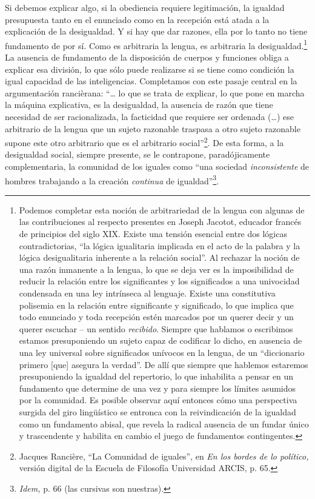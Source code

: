 Si debemos explicar algo, si la obediencia requiere legitimación, la igualdad presupuesta tanto en el enunciado como en la recepción está atada a la explicación de la desigualdad. Y si hay que dar razones, ella por lo tanto no tiene fundamento de por sí. Como es arbitraria la lengua, es arbitraria la desigualdad.\footnote{Podemos completar esta noción de arbitrariedad de la lengua con algunas de las contribuciones al respecto presentes en Joseph Jacotot, educador francés de principios del siglo XIX. Existe una tensión esencial entre dos lógicas contradictorias, \enquote{la lógica igualitaria implicada en el acto de la palabra y la lógica desigualitaria inherente a la relación social}. Al rechazar la noción de una razón inmanente a la lengua, lo que se deja ver es la imposibilidad de reducir la relación entre los significantes y los significados a una univocidad condensada en una ley intrínseca al lenguaje. Existe una constitutiva polisemia en la relación entre significante y significado, lo que implica que todo enunciado y toda recepción estén marcados por un querer decir  y un querer escuchar -- un sentido \emph{recibido}. Siempre que hablamos o escribimos estamos presuponiendo un sujeto capaz de codificar lo dicho, en ausencia de una ley universal sobre significados unívocos en la lengua, de un \enquote{diccionario primero {[}que{]} asegura la verdad}. De allí que siempre que hablemos estaremos presuponiendo la igualdad del repertorio, lo que inhabilita a pensar en un fundamento que determine de una vez y para siempre los límites asumidos por la comunidad. Es posible observar aquí entonces cómo una perspectiva surgida del giro lingüístico se entronca con la reivindicación de la igualdad como un fundamento abisal, que revela la radical ausencia de un fundar único y trascendente y habilita en cambio el juego de fundamentos contingentes.} La ausencia de fundamento de la disposición de cuerpos y funciones obliga a explicar esa división, lo que sólo puede realizarse si se tiene como condición la igual capacidad de las inteligencias. Completamos con este pasaje central en la argumentación rancièrana: \enquote{\ldots{} lo que se trata de explicar, lo que pone en marcha la máquina explicativa, es la desigualdad, la ausencia de razón que tiene necesidad de ser racionalizada, la facticidad que requiere ser ordenada (\dots) ese arbitrario de la lengua que un sujeto razonable traspasa a otro sujeto razonable supone este otro arbitrario que es el arbitrario social}\footnote{Jacques Rancière, \enquote{La Comunidad de iguales}, en \emph{En los bordes de lo político,} versión digital de la Escuela de Filosofía Universidad ARCIS, p. 65.}. De esta forma, a la desigualdad social, siempre presente, se le contrapone, paradójicamente complementaria, la comunidad de los iguales como \enquote{una sociedad \emph{inconsistente} de hombres trabajando a la creación \emph{continua} de igualdad}\footnote{\emph{Idem,} p. 66 (las cursivas son nuestras).}.


